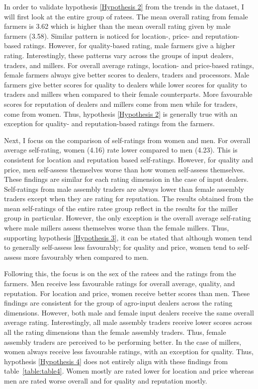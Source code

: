 \documentclass[12pt,english]{article}\usepackage[]{graphicx}\usepackage[]{color}
\begin{document}
\begin{onehalfspace}
In order to validate hypothesis \ref{Hypothesis 2} from the trends
in the dataset, I will first look at the entire group of ratees. The
mean overall rating from female farmers is 3.62
which is higher than the mean overall rating given by male farmers
(3.58).
Similar pattern is noticed for location-, price- and reputation-based
ratings. However, for quality-based rating, male farmers give a higher
rating. Interestingly, these patterns vary across the groups of input
dealers, traders, and millers. For overall average ratings, location-
and price-based ratings, female farmers always give better scores
to dealers, traders and processors. Male farmers give better scores
for quality to dealers while lower scores for quality to traders and
millers when compared to their female counterparts. More favourable
scores for reputation of dealers and millers come from men while for
traders, come from women. Thus, hypothesis \ref{Hypothesis 2} is
generally true with an exception for quality- and reputation-based
ratings from the farmers. 
\end{onehalfspace}

Next, I focus on the comparison of self-ratings from women and men.
For overall average self-rating, women (4.16)
rate lower compared to men (4.23).
This is consistent for location and reputation based self-ratings.
However, for quality and price, men self-assess themselves worse than
how women self-assess themselves. These findings are similar for each
rating dimension in the case of input dealers. Self-ratings from male
assembly traders are always lower than female assembly traders except
when they are rating for reputation. The results obtained from the
mean self-ratings of the entire ratee group reflect in the results
for the miller group in particular. However, the only exception is
the overall average self-rating where male millers assess themselves
worse than the female millers. Thus, supporting hypothesis \ref{Hypothesis 3},
it can be stated that although women tend to generally self-assess
less favourably; for quality and price, women tend to self-assess
more favourably when compared to men.

Following this, the focus is on the sex of the ratees and the ratings
from the farmers. Men receive less favourable ratings for overall
average, quality, and reputation. For location and price, women receive
better scores than men. These findings are consistent for the group
of agro-input dealers across the rating dimensions. However, both
male and female input dealers receive the same overall average rating.
Interestingly, all male assembly traders receive lower scores across
all the rating dimensions than the female assembly traders. Thus,
female assembly traders are perceived to be performing better. In
the case of millers, women always receive less favourable ratings,
with an exception for quality. Thus, hypothesis \ref{Hypothesis 4}
does not entirely align with these findings from table~\ref{table:table4}.
Women mostly are rated lower for location and price whereas men are
rated worse overall and for quality and reputation mostly. 
\end{document}
